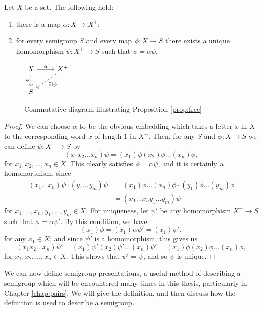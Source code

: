 \begin{proposition}
  \label{prop:free}
  Let $X$ be a set.  The following hold:
  \begin{enumerate}[\rm(i)]
  \item there is a map $\alpha: X \to X^+$;
  \item for every semigroup $S$ and every map $\phi: X \to S$ there exists a
    unique homomorphism $\psi: X^+ \to S$ such that $\phi = \alpha\psi$.
  \end{enumerate}
  \begin{figure}[ht]
    \centering
    $
    \begin{tikzcd}
      X \ar[d, "\phi"'] \ar[r, "\alpha"]
      & X^+ \ar[ld, dashed, "\exists ! \psi"] \\ S
    \end{tikzcd}
    $
    \caption{Commutative diagram illustrating Proposition \ref{prop:free}}
    \label{fig:free}
  \end{figure}
  \begin{proof}
    We can choose $\alpha$ to be the obvious embedding which takes a letter $x$
    in $X$ to the corresponding word $x$ of length $1$ in $X^+$.  Then, for any
    $S$ and $\phi: X \to S$ we can define $\psi: X^+ \to S$ by
    $$(x_1 x_2 \ldots x_n)\psi = (x_1)\phi (x_2)\phi \ldots (x_n)\phi,$$
    for $x_1, x_2, \ldots, x_n \in X$.  This clearly satisfies
    $\phi = \alpha\psi$, and it is certainly a homomorphism, since
    \begin{align*}
      (x_1 \ldots x_n)\psi \cdot (y_1 \ldots y_m)\psi
      & = (x_1)\phi\ldots(x_n)\phi \cdot (y_1)\phi\ldots(y_m)\phi \\
      & = (x_1 \ldots x_ny_1 \ldots y_m)\psi
    \end{align*}
    for $x_1, \ldots, x_n, y_1, \ldots, y_m \in X$.  For uniqueness, let $\psi'$
    be any homomorphism $X^+ \to S$ such that $\phi = \alpha\psi'$.  By this
    condition, we have
    $$(x_1)\phi = (x_1)\alpha\psi' = (x_1)\psi',$$
    for any $x_1 \in X$; and since $\psi'$ is a homomorphism, this gives us
    $$(x_1x_2\ldots x_n)\psi'
    = (x_1)\psi'(x_2)\psi'\ldots(x_n)\psi'
    = (x_1)\phi (x_2)\phi \ldots(x_n)\phi,$$
    for $x_1, x_2, \ldots, x_n \in X$.
    This shows that $\psi' = \psi$, and so $\psi$ is unique.
  \end{proof}
\end{proposition}

We can now define semigroup presentations, a useful method of describing a
semigroup which will be encountered many times in this thesis, particularly in
Chapter \ref{chap:pairs}.  We will give the definition, and then discuss how the
definition is used to describe a semigroup.

